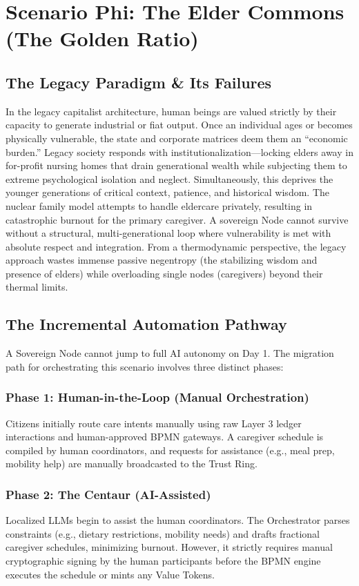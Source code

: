 \chapter{Scenario Phi: The Elder Commons (The Golden Ratio)}

\section{The Legacy Paradigm \& Its Failures}
In the legacy capitalist architecture, human beings are valued strictly by their capacity to generate industrial or fiat output. Once an individual ages or becomes physically vulnerable, the state and corporate matrices deem them an ``economic burden.'' Legacy society responds with institutionalization---locking elders away in for-profit nursing homes that drain generational wealth while subjecting them to extreme psychological isolation and neglect. Simultaneously, this deprives the younger generations of critical context, patience, and historical wisdom. The nuclear family model attempts to handle eldercare privately, resulting in catastrophic burnout for the primary caregiver. A sovereign Node cannot survive without a structural, multi-generational loop where vulnerability is met with absolute respect and integration. From a thermodynamic perspective, the legacy approach wastes immense passive negentropy (the stabilizing wisdom and presence of elders) while overloading single nodes (caregivers) beyond their thermal limits.

\section{The Incremental Automation Pathway}
A Sovereign Node cannot jump to full AI autonomy on Day 1. The migration path for orchestrating this scenario involves three distinct phases:

\subsection{Phase 1: Human-in-the-Loop (Manual Orchestration)}
Citizens initially route care intents manually using raw Layer 3 ledger interactions and human-approved BPMN gateways. A caregiver schedule is compiled by human coordinators, and requests for assistance (e.g., meal prep, mobility help) are manually broadcasted to the Trust Ring. 

\subsection{Phase 2: The Centaur (AI-Assisted)}
Localized LLMs begin to assist the human coordinators. The Orchestrator parses constraints (e.g., dietary restrictions, mobility needs) and drafts fractional caregiver schedules, minimizing burnout. However, it strictly requires manual cryptographic signing by the human participants before the BPMN engine executes the schedule or mints any Value Tokens.

